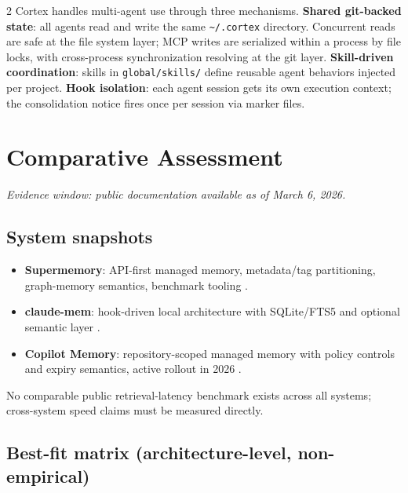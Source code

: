 \documentclass[10pt]{article}
\begin{document}
\begin{multicols}{2}
Cortex handles multi-agent use through three mechanisms. \textbf{Shared git-backed state}: all agents read and write the same \texttt{\textasciitilde/.cortex} directory. Concurrent reads are safe at the file system layer; MCP writes are serialized within a process by file locks, with cross-process synchronization resolving at the git layer. \textbf{Skill-driven coordination}: skills in \texttt{global/skills/} define reusable agent behaviors injected per project. \textbf{Hook isolation}: each agent session gets its own execution context; the consolidation notice fires once per session via marker files.

\section{Comparative Assessment}
\textit{Evidence window: public documentation available as of March 6, 2026.}

\subsection{System snapshots}
\begin{itemize}
  \item \textbf{Supermemory}: API-first managed memory, metadata/tag partitioning, graph-memory semantics, benchmark tooling \cite{sm-intro,sm-create,sm-filter,sm-graph,sm-bench}.
  \item \textbf{claude-mem}: hook-driven local architecture with SQLite/FTS5 and optional semantic layer \cite{cm-overview,cm-hooks,cm-db,cm-search}.
  \item \textbf{Copilot Memory}: repository-scoped managed memory with policy controls and expiry semantics, active rollout in 2026 \cite{gh-memory-docs,gh-changelog-jan2026,gh-changelog-mar2026}.
\end{itemize}

No comparable public retrieval-latency benchmark exists across all systems; cross-system speed claims must be measured directly.

\end{multicols}

\vspace{0.2em}
\subsection{Best-fit matrix (architecture-level, non-empirical)}
\end{document}

